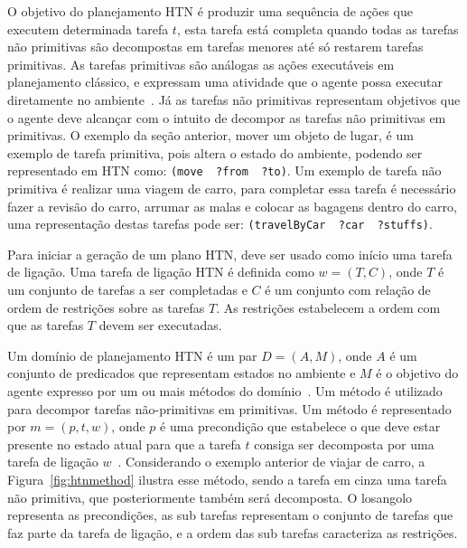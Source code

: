 O objetivo do planejamento HTN é produzir uma sequência de ações que executem determinada tarefa $t$, esta tarefa está completa quando todas as tarefas não primitivas são decompostas em tarefas menores até só restarem tarefas primitivas.  
As tarefas primitivas são análogas as ações executáveis em planejamento clássico, e expressam uma atividade que o agente possa executar diretamente no ambiente~\cite[Capítulo 11]{intelligence2003modern}. 
Já as tarefas não primitivas representam objetivos que o agente deve alcançar com o intuito de decompor as tarefas não primitivas em primitivas. 
O exemplo da seção anterior, mover um objeto de lugar, é um exemplo de tarefa primitiva, pois altera o estado do ambiente, podendo ser representado em HTN como: \texttt{(move~ ?from~ ?to)}. 
Um exemplo de tarefa não primitiva é realizar uma viagem de carro, para completar essa tarefa é necessário fazer a revisão do carro, arrumar as malas e colocar as bagagens dentro do carro, uma representação destas tarefas pode ser: \texttt{(travelByCar ~?car~ ?stuffs)}. 

Para iniciar a geração de um plano HTN, deve ser usado como início uma tarefa de ligação. 
Uma tarefa de ligação HTN é definida como $w = (T, C)$, onde $T$ é um conjunto de tarefas a ser completadas e $C$ é um conjunto com relação de ordem de restrições sobre as tarefas $T$. 
As restrições estabelecem a ordem com que as tarefas $T$ devem ser executadas. 

Um domínio de planejamento HTN é um par $D = (A, M)$, onde $A$ é um conjunto de predicados que representam estados no ambiente e $M$ é o objetivo do agente expresso por um ou mais métodos do domínio~\cite{meneguzzi2015planning}. 
Um método é utilizado para decompor tarefas não-primitivas em primitivas. 
Um método é representado por $m = (p, t, w)$, onde $p$ é uma precondição que estabelece o que deve estar presente no estado atual para que a tarefa $t$ consiga ser decomposta por uma tarefa de ligação $w$~\cite{ghallab2004automated}. 
Considerando o exemplo anterior de viajar de carro, a Figura~\ref{fig:htnmethod} ilustra esse método, sendo a tarefa em cinza uma tarefa não primitiva, que posteriormente também será decomposta. 
O losangolo representa as precondições, as sub tarefas representam o conjunto de tarefas que faz parte da tarefa de ligação, e a ordem das sub tarefas caracteriza as restrições. 

